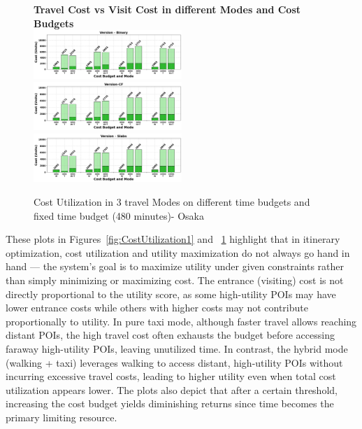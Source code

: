 \begin{figure}[th]
\textbf{Travel Cost vs Visit Cost in different Modes and Cost Budgets}\\
\includegraphics[width=0.5\textwidth]{plots/CU4_pkj.png}
\includegraphics[width=0.5\textwidth]{plots/CU5_pkj.png}
\includegraphics[width=0.5\textwidth]{plots/CU6_pkj.png}
\hspace{8pt}
\caption{Cost Utilization in 3 travel Modes on different time budgets and fixed time budget (480 minutes)- Osaka}
\label{fig:CostUtilization2}
\end{figure}

These plots in Figures~\ref{fig:CostUtilization1} and ~\ref{fig:CostUtilization2} highlight that in itinerary optimization, cost utilization and utility maximization do not always go hand in hand — the system’s goal is to maximize utility under given constraints rather than simply minimizing or maximizing cost. The entrance (visiting) cost is not directly proportional to the utility score, as some high-utility POIs may have lower entrance costs while others with higher costs may not contribute proportionally to utility. In pure taxi mode, although faster travel allows reaching distant POIs, the high travel cost often exhausts the budget before accessing faraway high-utility POIs, leaving unutilized time. In contrast, the hybrid mode (walking + taxi) leverages walking to access distant, high-utility POIs without incurring excessive travel costs, leading to higher utility even when total cost utilization appears lower. The plots also depict that after a certain threshold, increasing the cost budget yields diminishing returns since time becomes the primary limiting resource.


